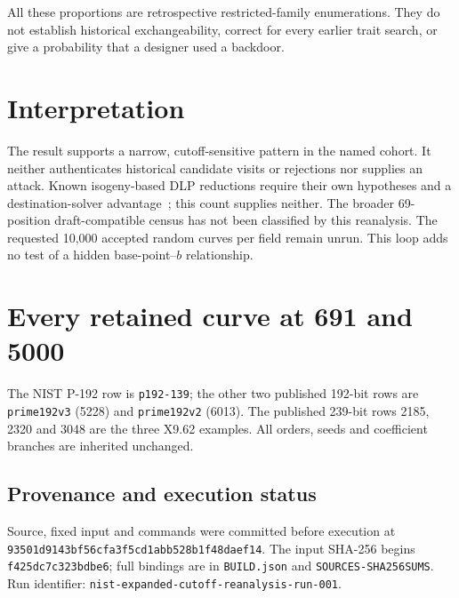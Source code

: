\documentclass[10pt]{article}
\begin{document}
All these proportions are retrospective restricted-family enumerations. They
do not establish historical exchangeability, correct for every earlier trait
search, or give a probability that a designer used a backdoor.

\section{Interpretation}
The result supports a narrow, cutoff-sensitive pattern in the named cohort.
It neither authenticates historical candidate visits or rejections nor supplies
an attack. Known isogeny-based DLP reductions require their own hypotheses and
a destination-solver advantage~\cite{jmv}; this count supplies neither. The
broader 69-position draft-compatible census has not been classified by this
reanalysis. The requested 10,000 accepted random curves per field remain
unrun. This loop adds no test of a hidden base-point--$b$ relationship.
\clearpage

\section{Every retained curve at 691 and 5000}
\begin{table}[!ht]
\centering\small

\caption{All 21 rows. P means published and U means a named unpublished
candidate; U does not certify historical visitation or rejection. $S$ counts
strict positive characters and $R$ counts ramified characters. No singleton
control or unknown historical base point is used as a numeric rejection label.}
\end{table}

The NIST P-192 row is \texttt{p192-139}; the other two published 192-bit rows
are \texttt{prime192v3} (5228) and \texttt{prime192v2} (6013).
The published 239-bit rows 2185, 2320 and 3048 are the three X9.62 examples.
All orders, seeds and coefficient branches are inherited unchanged.

\subsection*{Provenance and execution status}
Source, fixed input and commands were committed before execution at
\nolinkurl{93501d9143bf56cfa3f5cd1abb528b1f48daef14}. The input SHA-256 begins
\texttt{f425dc7c323bdbe6}; full bindings are in \texttt{BUILD.json} and
\texttt{SOURCES-SHA256SUMS}. Run identifier:
\texttt{nist-expanded-cutoff-reanalysis-run-001}.
\end{document}
